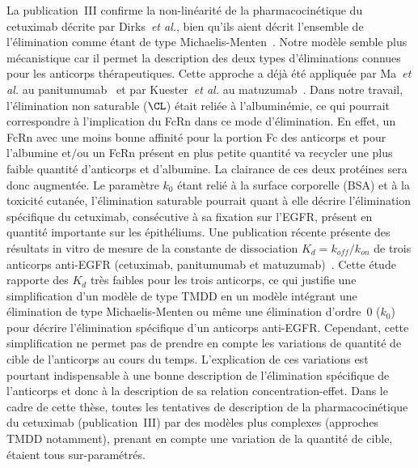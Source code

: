 La publication~III confirme la non-linéarité de la pharmacocinétique du cetuximab décrite par Dirks~\textit{et al.}, bien qu'ils aient décrit l'ensemble de l'élimination comme étant de type Michaelis-Menten~\citep{REF68}. Notre modèle semble plus mécanistique car il permet la description des deux types d'éliminations connues pour les anticorps thérapeutiques. Cette approche a déjà été appliquée par Ma~\textit{et al.} au panitumumab~\citep{REF73} et par Kuester~\textit{et al.} au matuzumab~\citep{REF129}. Dans notre travail, l'élimination non saturable ($\CL$) était reliée à l'albuminémie, ce qui pourrait correspondre à l'implication du FcRn dans ce mode d'élimination. En effet, un FcRn avec une moins bonne affinité pour la portion Fc des anticorps et pour l'albumine et$/$ou un FcRn présent en plus petite quantité va recycler une plus faible quantité d'anticorps et d'albumine. La clairance de ces deux protéines sera donc augmentée. Le paramètre $k_0$ étant relié à la surface corporelle (BSA) et à la toxicité cutanée, l'élimination saturable pourrait quant à elle décrire l'élimination spécifique du cetuximab, consécutive à sa fixation sur l'EGFR, présent en quantité importante sur les épithéliums. Une publication récente présente des résultats in vitro de mesure de la constante de dissociation $K_d = k_{off}/k_{on}$ de trois anticorps anti-EGFR (cetuximab, panitumumab et matuzumab)~\citep{REF144}. Cette étude rapporte des $K_d$ très faibles pour les trois anticorps, ce qui justifie une simplification d'un modèle de type TMDD en un modèle intégrant une élimination de type Michaelis-Menten ou même une élimination d'ordre~0 ($k_0$) pour décrire l'élimination spécifique d'un anticorps anti-EGFR. Cependant, cette simplification ne permet pas de prendre en compte les variations de quantité de cible de l'anticorps au cours du temps. L'explication de ces variations est pourtant indispensable à une bonne description de l'élimination spécifique de l'anticorps et donc à la description de sa relation concentration-effet. Dans le cadre de cette thèse, toutes les tentatives de description de la pharmacocinétique du cetuximab (publication~III) par des modèles plus complexes (approches TMDD notamment), prenant en compte une variation de la quantité de cible, étaient tous sur-paramétrés.

